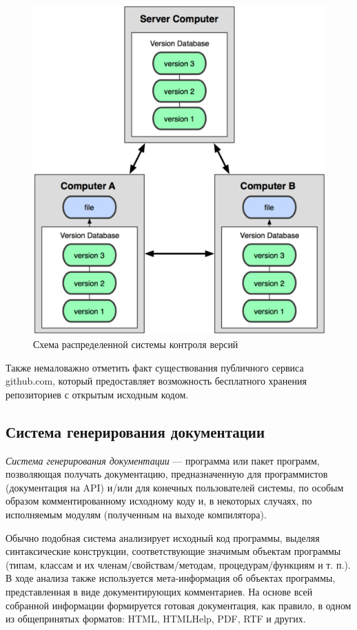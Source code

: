 \begin{figure}[h!]
  \centering
  \includegraphics[width=150mm]{pic/git.png}
  \caption{Схема распределенной системы контроля версий}
  \label{pic:git}
\end{figure}

Также немаловажно отметить факт существования публичного сервиса github.com,
который предоставляет возможность бесплатного хранения репозиториев
с открытым исходным кодом.

\subsection{Система генерирования документации}

\textit{Система генерирования документации} --- программа или пакет программ, 
позволяющая получать документацию, предназначенную для программистов
(документация на API) и/или для конечных пользователей системы,
по особым образом комментированному исходному коду и,
в некоторых случаях, по исполняемым модулям (полученным на выходе компилятора).

Обычно подобная система анализирует исходный код программы,
выделяя синтаксические конструкции, соответствующие значимым объектам программы 
(типам, классам и их членам/свойствам/методам, процедурам/функциям и т. п.).
В ходе анализа также используется мета-информация об объектах программы,
представленная в виде документирующих комментариев. 
На основе всей собранной информации формируется готовая документация, 
как правило, в одном из общепринятых форматов: HTML, HTMLHelp, PDF, 
RTF и других.

